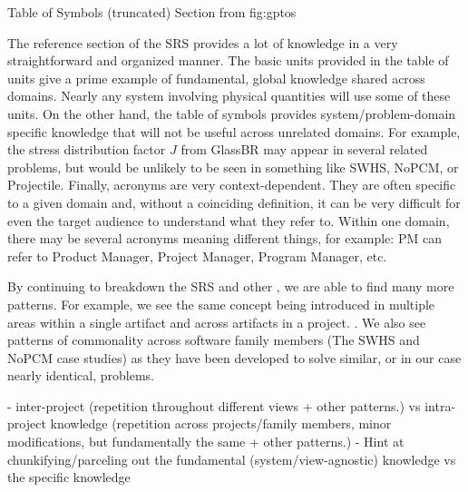 {Table of Symbols (truncated) Section from \gp{}}
{fig:gptos}

The reference section of the SRS provides a lot of knowledge in a very 
straightforward and organized manner. The basic units provided in the table of 
units give a prime example of fundamental, global knowledge shared across 
domains. Nearly any system involving physical quantities will use some of these 
units. On the other hand, the table of symbols provides system/problem-domain 
specific knowledge that will not be useful across unrelated domains. For 
example, the stress distribution factor $J$ from GlassBR may appear in several 
related problems, but would be unlikely to be seen in something like SWHS, 
NoPCM, or Projectile. Finally, acronyms are very context-dependent. They are 
often specific to a given domain and, without a coinciding definition, it can 
be very difficult for even the target audience to understand what they refer 
to. Within one domain, there may be several acronyms meaning different things, 
for example: PM can refer to Product Manager, Project Manager, Program 
Manager, etc.

By continuing to breakdown the SRS and other \sfs{}, we are able to find many 
more patterns. For example, we see the same concept being introduced in 
multiple areas within a single artifact and across artifacts in a project. 
. We 
also see patterns of commonality across software family members (The SWHS and 
NoPCM case studies) as they have been developed to solve similar, or in our 
case nearly identical, problems.

- inter-project (repetition throughout different views + other patterns.)
  vs intra-project knowledge (repetition across projects/family members,
  minor modifications, but fundamentally the same + other patterns.)
- Hint at chunkifying/parceling out the fundamental (system/view-agnostic)
knowledge vs the specific knowledge

